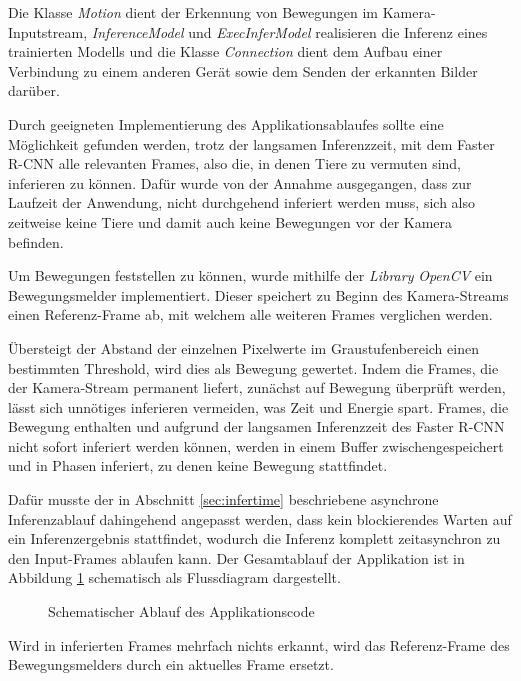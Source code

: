 Die Klasse \textit{Motion} dient der Erkennung von Bewegungen 
im Kamera-Inputstream, \textit{InferenceModel} und
\textit{ExecInferModel} realisieren die Inferenz 
eines trainierten Modells und die Klasse 
\textit{Connection} dient dem Aufbau einer
Verbindung zu einem anderen Gerät sowie dem Senden
der erkannten Bilder darüber.

Durch geeigneten Implementierung des Applikationsablaufes
sollte eine Möglichkeit gefunden werden, trotz 
der langsamen Inferenzzeit, mit dem Faster R-CNN
alle relevanten Frames, also die, in denen Tiere zu vermuten
sind, inferieren zu können.
Dafür wurde von der Annahme ausgegangen, dass zur Laufzeit der 
Anwendung, nicht durchgehend inferiert werden muss,
sich also zeitweise keine Tiere und damit auch keine 
Bewegungen vor der Kamera befinden.

Um Bewegungen feststellen zu können, 
wurde mithilfe der \textit{Library} \textit{OpenCV}
ein Bewegungsmelder implementiert.
Dieser speichert zu Beginn des Kamera-Streams einen 
Referenz-Frame ab, mit welchem alle weiteren Frames verglichen
werden.

Übersteigt der Abstand der einzelnen Pixelwerte im 
Graustufenbereich einen bestimmten
Threshold, wird dies als Bewegung gewertet.
Indem die Frames, die der Kamera-Stream permanent 
liefert, zunächst auf Bewegung überprüft werden, 
lässt sich unnötiges inferieren vermeiden,
was Zeit und Energie spart.
Frames, die Bewegung enthalten und aufgrund der langsamen 
Inferenzzeit des Faster R-CNN nicht sofort inferiert 
werden können, werden in einem Buffer zwischengespeichert
und in Phasen inferiert, zu denen keine Bewegung stattfindet.

Dafür musste der in Abschnitt \ref{sec:infertime} beschriebene
asynchrone Inferenzablauf dahingehend angepasst werden,
dass kein blockierendes Warten auf 
ein Inferenzergebnis stattfindet,
wodurch die Inferenz komplett zeitasynchron zu 
den Input-Frames ablaufen kann.
Der Gesamtablauf der Applikation ist in Abbildung 
\ref{fig:flowchart_appl} 
schematisch als Flussdiagram dargestellt.

\vspace{1cm}
\begin{figure}[H]
    \centering
        
    \caption{Schematischer Ablauf des Applikationscode}
    \label{fig:flowchart_appl}
\end{figure}
\vspace{1cm}


Wird in inferierten Frames mehrfach nichts 
erkannt, wird das Referenz-Frame des 
Bewegungsmelders durch ein aktuelles Frame ersetzt.

